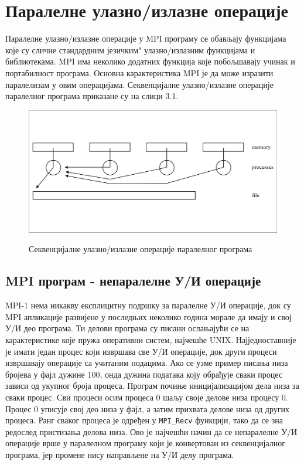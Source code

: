 \section{Паралелне улазно/излазне операције}

Паралелне улазно/излазне операције у MPI програму се обављају функцијама које су сличне стандардним \zn језичким" улазно/излазним функцијама и библиотекама. MPI има неколико додатних функција које побољшавају  учинак и портабилност програма. Основна карактеристика MPI је да може изразити паралелизам у овим операцијама. Секвенцијалне улазно/излазне операције паралелног програма приказане су на слици 3.1.

\begin{figure}[h!]
  \centering
      \includegraphics[width=1\textwidth]{slike/sequential_i_o.png}\\[1cm]
  \caption{Секвенцијалне улазно/излазне операције паралелног програма}
\end{figure}

\subsection{MPI програм - непаралелне У/И операције}

MPI-1 нема никакву експлицитну подршку за паралелне У/И операције, док су MPI апликације развијене у последњих неколико година морале да имају и свој У/И део програма. Ти делови програма су писани ослањајући се на карактеристике које пружа оперативни систем, најчешће UNIX. Најједноставније је имати један процес који извршава све У/И операције, док други процеси извршавају операције са учитаним подацима. Ако се узме пример писања низа бројева у фајл дужине 100, онда дужина података коју обрађује сваки процес зависи од укупног броја процеса. Програм почиње иницијализацијом дела низа за сваки процес. Сви процеси осим процеса 0 шаљу своје делове низа процесу 0. Процес 0 уписује свој део низа у фајл, а затим прихвата делове низа од других процеса. Ранг сваког процеса је одређен у  \texttt{MPI\_Recv} функцији, тако да се зна редослед пристизања делова низа. Ово је најчешћи начин да се непаралелне У/И операције врше у паралелном програму који је конвертован из секвенцијалног програма, јер промене нису  направљене на У/И делу програма. 

